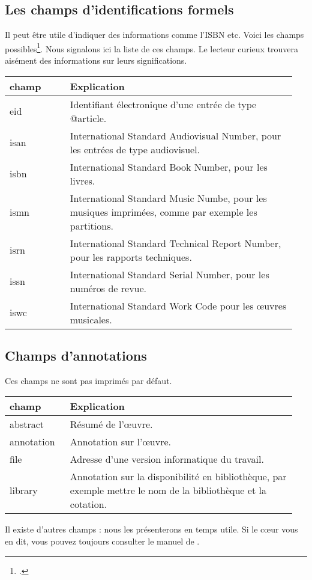 \subsection{Les champs d'identifications formels}

Il peut être utile d'indiquer des informations comme l'ISBN etc. Voici les champs possibles\footcite[BibLaTeX imprimera ces champs par défaut, il est toutefois possible de ne pas les afficher en passant une option au chargement du package]{explicationisbn}. Nous signalons ici la liste de ces champs. Le lecteur curieux trouvera aisément des informations sur leurs significations.

\begin{longtable}{p{0.2\linewidth}p{0.75\linewidth}}
	champ 		& Explication \\
	\endhead
	eid			& Identifiant électronique d'une entrée de type @article. \\
	isan			& \textenglish{International Standard Audiovisual Number}, pour les entrées de type audiovisuel.\\
	isbn			& \textenglish{International Standard Book Number}, pour les livres. \\
	ismn			& \textenglish{International Standard Music Numbe}, pour les musiques imprimées, comme par exemple les partitions. \\
	isrn			& \textenglish{International Standard Technical Report Number}, pour les rapports techniques. \\
	issn			& \textenglish{International Standard Serial Number}, pour les numéros de revue. \\
	iswc			& \textenglish{International Standard Work Code} pour les œuvres musicales.
\end{longtable}

\subsection{Champs d'annotations}

Ces champs ne sont pas imprimés par défaut. 

\begin{longtable}{p{0.2\linewidth}p{0.75\linewidth}}
	champ 		& Explication \\
	\endhead
	abstract			& Résumé de l'œuvre. \\
	annotation			& Annotation sur l'œuvre.\\
	file			& Adresse d'une version informatique du travail. \\
	library			& Annotation sur la disponibilité en bibliothèque, par exemple mettre le nom de la bibliothèque et la cotation.
	
\end{longtable}

Il existe d'autres champs : nous les présenterons en temps utile. Si le cœur vous en dit, vous pouvez toujours consulter le manuel de .